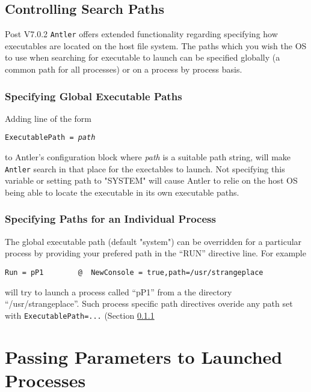 \documentclass[a4paper,10pt]{article}
\newcommand{\Code}[1]{\texttt{#1} }
\newcommand{\code}[1]{\Code{#1} }
\begin{document}
\subsection{Controlling Search Paths}

Post V7.0.2 \code{Antler} offers extended functionality regarding specifying how executables are located on the host file system. The paths which you wish the OS to use when searching for executable to launch can be specified globally (a common path for all processes) or on a process by process basis.

\subsubsection{Specifying Global Executable Paths}\label{Sec:ExecPath}

Adding line of the form
\begin{center}
\code{ExecutablePath = {\it{path}}}
\end{center}
to Antler's configuration block where {\it{path}} is a suitable path string, will make \code{Antler} search in that place for the exectables  to launch. Not specifying this variable or setting path to "SYSTEM" will  cause Antler to relie on the host OS being able to locate the executable in its own executable paths.

\subsubsection{Specifying Paths for an Individual Process}

The global executable path (default "system") can be overridden for a particular process by providing your prefered path in the ``RUN'' directive line. For example
\begin{lstlisting}
Run = pP1        @  NewConsole = true,path=/usr/strangeplace
\end{lstlisting}

will try to launch a process called ``pP1'' from a the directory ``/usr/strangeplace''.  Such process specific path directives overide any path set with \code{ExecutablePath=...} (Section \ref{Sec:ExecPath}

\section{Passing Parameters to Launched Processes}\label{Sec:ExeParameters}
\end{document}

